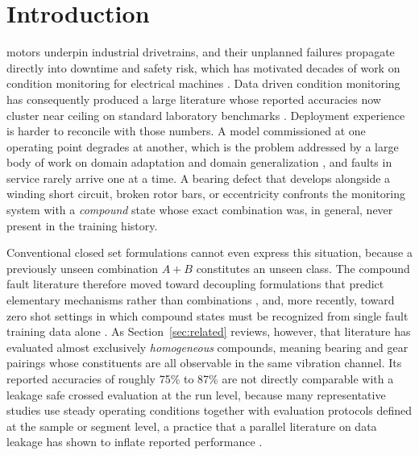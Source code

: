 \documentclass{ieeeaccess}
\begin{document}
\titlepgskip=-15pt

\maketitle

\section{Introduction}
\label{sec:introduction}
 motors underpin industrial drivetrains, and their
unplanned failures propagate directly into downtime and safety risk, which
has motivated decades of work on condition monitoring for electrical
machines \cite{nandi2005review,bellini2008advances}. Data driven condition
monitoring has consequently produced a large literature whose reported
accuracies now cluster near ceiling on standard laboratory benchmarks
\cite{zhao2020benchmark}. Deployment experience is harder to reconcile with
those numbers. A model commissioned at one operating point degrades at
another, which is the problem addressed by a large body of work on domain
adaptation and domain generalization \cite{han2025,domainshift2025}, and
faults in service rarely arrive one at a time. A bearing defect that develops
alongside a winding short circuit, broken rotor bars, or eccentricity
confronts the monitoring system with a \emph{compound} state whose exact
combination was, in general, never present in the training history.

Conventional closed set formulations cannot even express this situation,
because a previously unseen combination $A{+}B$ constitutes an unseen class.
The compound fault literature therefore moved toward decoupling formulations
that predict elementary mechanisms rather than combinations
\cite{huang2019ddcnn,ltssbow2024,hemtan2024}, and, more recently, toward zero
shot settings in which compound states must be recognized from single fault
training data alone \cite{eswa2022,eswa2023,song2025gzsl}. As
Section~\ref{sec:related} reviews, however, that literature has evaluated
almost exclusively \emph{homogeneous} compounds, meaning bearing and gear
pairings whose constituents are all observable in the same vibration channel.
Its reported accuracies of roughly 75\% to 87\%
\cite{eswa2022,eswa2023,song2025gzsl,appac2025} are not directly comparable
with a leakage safe crossed evaluation at the run level, because many
representative studies use steady operating conditions together with
evaluation protocols defined at the sample or segment level, a practice that
a parallel literature on data leakage has shown to inflate reported
performance \cite{wheat2024,gama2025,phme2025}.
\end{document}
